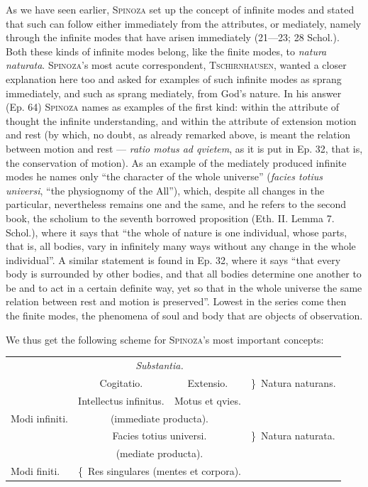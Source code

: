 \documentclass[12pt]{article}
\begin{document}
As we have seen earlier, \textsc{Spinoza} set up the concept of infinite modes and stated
that such can follow either immediately from the attributes, or mediately, namely through
the infinite modes that have arisen immediately (21---23; 28 Schol.). Both these kinds of
infinite modes belong, like the finite modes, to \textit{natura naturata}.
\textsc{Spinoza}'s most acute correspondent, \textsc{Tschirnhausen}, wanted a closer
explanation here too and asked for examples of such infinite modes as sprang immediately,
and such as sprang mediately, from God's nature. In his answer (Ep. 64) \textsc{Spinoza}
names as examples of the first kind: within the attribute of thought the infinite
understanding, and within the attribute of extension motion and rest (by which, no doubt,
as already remarked above, is meant the relation between motion and rest --- \textit{ratio
motus ad qvietem}, as it is put in Ep. 32, that is, the conservation of motion). As an
example of the mediately produced infinite modes he names only ``the character of the
whole universe'' (\textit{facies totius universi}, ``the physiognomy of the All''),
which, despite all changes in the particular, nevertheless remains one and the same, and
he refers to the second book, the scholium to the seventh borrowed proposition (Eth. II.
Lemma 7. Schol.), where it says that ``the whole of nature is one individual, whose parts,
that is, all bodies, vary in infinitely many ways without any change in the whole
individual''. A similar statement is found in Ep. 32, where it says ``that every body is
surrounded by other bodies, and that all bodies determine one another to be and to act
in a certain definite way, yet so that in the whole universe the same relation between
rest and motion is preserved''. Lowest in the series come then the finite modes, the
phenomena of soul and body that are objects of observation.

We thus get the following scheme for \textsc{Spinoza}'s most important concepts:
\begin{center}\small
\begin{tabular}{lccl}
 & \multicolumn{2}{c}{\textit{Substantia.}} & \\
 & Cogitatio. & Extensio. & \}\ Natura naturans. \\[0.5em]
 & Intellectus infinitus. & Motus et qvies. & \\
Modi infiniti. & \multicolumn{2}{c}{(immediate producta).} & \\
 & \multicolumn{2}{c}{Facies totius universi.} & \}\ Natura naturata. \\
 & \multicolumn{2}{c}{(mediate producta).} & \\[0.5em]
Modi finiti. & \multicolumn{2}{l}{\{\ Res singulares (mentes et corpora).} & \\
\end{tabular}
\end{center}
\end{document}

